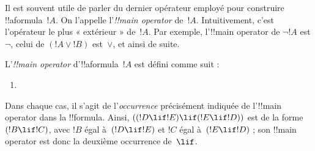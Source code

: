 \documentclass[../../../include/open-logic-section]{subfiles}
\begin{document}


\begin{explain}
Il est souvent utile de parler du dernier opérateur employé pour
construire !!a{formula}~$!A$. On l'appelle l'\emph{!!{main operator}}
de~$!A$. Intuitivement, c'est l'opérateur le plus « extérieur »
de~$!A$. Par exemple, l'!!{main operator} de $\lnot !A$ est
$\lnot$, celui de $(!A \lor !B)$ est~$\lor$, et ainsi de suite.
\end{explain}

\begin{defn}
L'\emph{!!{main operator}} d'!!a{formula}~$!A$ est défini comme suit :
\begin{enumerate}
\item {}







\end{enumerate}
\end{defn}

Dans chaque cas, il s'agit de l'\emph{occurrence} précisément indiquée
de l'!!{main operator} dans la !!{formula}. Ainsi,
$((!D \lif !E) \lif (!E \lif !D))$ est de la forme $(!B \lif !C)$,
avec $!B$ égal à~$(!D \lif !E)$ et $!C$ égal à~$(!E \lif !D)$ ;
son !!{main operator} est donc la deuxième occurrence de~$\lif$.
\end{document}
